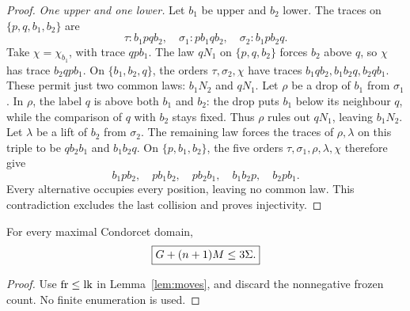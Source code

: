 \begin{proof}
\emph{One upper and one lower.} Let \(b_1\) be upper and \(b_2\)
lower. The traces on \(\{p,q,b_1,b_2\}\) are
\[
 \tau:b_1pqb_2,\quad\sigma_1:pb_1qb_2,\quad\sigma_2:b_1pb_2q.
\]
Take \(\chi=\chi_{b_1}\), with trace \(qpb_1\). The law \(qN_1\)
on \(\{p,q,b_2\}\) forces \(b_2\) above \(q\), so \(\chi\)
has trace \(b_2qpb_1\). On \(\{b_1,b_2,q\}\), the orders
\(\tau,\sigma_2,\chi\) have traces
\(b_1qb_2,b_1b_2q,b_2qb_1\). These permit just two common laws:
\(b_1N_2\) and \(qN_1\). Let \(\rho\) be a drop of \(b_1\)
from \(\sigma_1\). In \(\rho\), the label \(q\) is above both
\(b_1\) and \(b_2\): the drop puts \(b_1\) below its neighbour
\(q\), while the comparison of \(q\) with \(b_2\) stays fixed.
Thus \(\rho\) rules out \(qN_1\), leaving \(b_1N_2\).
Let \(\lambda\) be a lift of \(b_2\) from \(\sigma_2\).
The remaining law forces the traces of \(\rho,\lambda\) on this
triple to be \(qb_2b_1\) and \(b_1b_2q\).
On \(\{p,b_1,b_2\}\), the five orders
\(\tau,\sigma_1,\rho,\lambda,\chi\) therefore give
\[
 b_1pb_2,\quad pb_1b_2,\quad pb_2b_1,\quad b_1b_2p,\quad b_2pb_1.
\]
Every alternative occupies every position, leaving no common law.
This contradiction excludes the last collision and proves injectivity.
\end{proof}

\begin{theorem}\label{thm:gap}
For every maximal Condorcet domain,
\[
 \boxed{G+(n+1)M\leq3\Sigma.}
\]
\end{theorem}
\begin{proof}
Use \(\operatorname{fr}\leq\operatorname{lk}\) in Lemma~\ref{lem:moves}, and discard the
nonnegative frozen count. No finite enumeration is used.
\end{proof}
